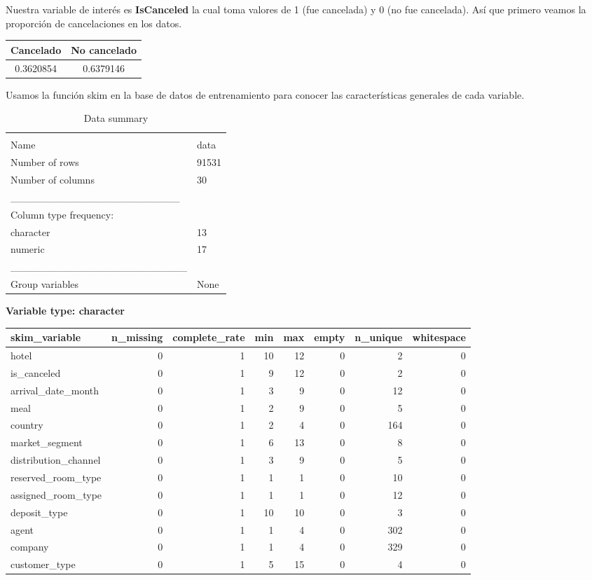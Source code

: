 \documentclass[
]{article}
\begin{document}
Nuestra variable de interés es \textbf{IsCanceled} la cual toma valores
de 1 (fue cancelada) y 0 (no fue cancelada). Así que primero veamos la
proporción de cancelaciones en los datos.

\begin{longtable}[]{@{}cc@{}}
\toprule
Cancelado & No cancelado \\
\midrule
\endhead
0.3620854 & 0.6379146 \\
\bottomrule
\end{longtable}

Usamos la función skim en la base de datos de entrenamiento para conocer
las características generales de cada variable.

\begin{longtable}[]{@{}ll@{}}
\caption{Data summary}\tabularnewline
\toprule
& \\
\midrule
\endfirsthead
\toprule
& \\
\midrule
\endhead
Name & data \\
Number of rows & 91531 \\
Number of columns & 30 \\
\_\_\_\_\_\_\_\_\_\_\_\_\_\_\_\_\_\_\_\_\_\_\_ & \\
Column type frequency: & \\
character & 13 \\
numeric & 17 \\
\_\_\_\_\_\_\_\_\_\_\_\_\_\_\_\_\_\_\_\_\_\_\_\_ & \\
Group variables & None \\
\bottomrule
\end{longtable}

\textbf{Variable type: character}

\begin{longtable}[]{@{}lrrrrrrr@{}}
\toprule
skim\_variable & n\_missing & complete\_rate & min & max & empty &
n\_unique & whitespace \\
\midrule
\endhead
hotel & 0 & 1 & 10 & 12 & 0 & 2 & 0 \\
is\_canceled & 0 & 1 & 9 & 12 & 0 & 2 & 0 \\
arrival\_date\_month & 0 & 1 & 3 & 9 & 0 & 12 & 0 \\
meal & 0 & 1 & 2 & 9 & 0 & 5 & 0 \\
country & 0 & 1 & 2 & 4 & 0 & 164 & 0 \\
market\_segment & 0 & 1 & 6 & 13 & 0 & 8 & 0 \\
distribution\_channel & 0 & 1 & 3 & 9 & 0 & 5 & 0 \\
reserved\_room\_type & 0 & 1 & 1 & 1 & 0 & 10 & 0 \\
assigned\_room\_type & 0 & 1 & 1 & 1 & 0 & 12 & 0 \\
deposit\_type & 0 & 1 & 10 & 10 & 0 & 3 & 0 \\
agent & 0 & 1 & 1 & 4 & 0 & 302 & 0 \\
company & 0 & 1 & 1 & 4 & 0 & 329 & 0 \\
customer\_type & 0 & 1 & 5 & 15 & 0 & 4 & 0 \\
\bottomrule
\end{longtable}
\end{document}

